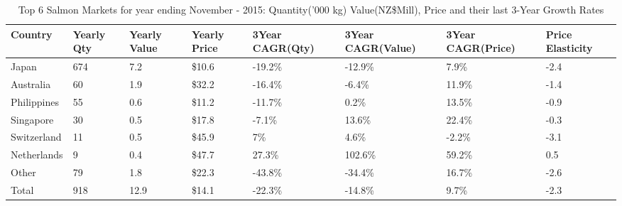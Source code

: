 \begin{table}[ht]
\centering
{\scriptsize
\begin{tabular}[t]{p{1.8cm}>{\hfill}p{1.4cm}>{\hfill}p{1.4cm}>{\hfill}p{1.6cm}>{\hfill}p{1.9cm}>{\hfill}p{2cm}>{\hfill}p{1.9cm}>{\hfill}p{1.5cm}}
 \textbf{Country} & \textbf{Yearly Qty} & \textbf{Yearly Value} & \textbf{Yearly Price} & \textbf{3Year CAGR(Qty)} & \textbf{3Year CAGR(Value)} & \textbf{3Year CAGR(Price)} & \textbf{Price Elasticity} \\
\hline
Japan & 674 & 7.2 & \$10.6 & -19.2\% & -12.9\% & 7.9\% & -2.4 \\  
Australia & 60 & 1.9 & \$32.2 & -16.4\% & -6.4\% & 11.9\% & -1.4 \\  
Philippines & 55 & 0.6 & \$11.2 & -11.7\% & 0.2\% & 13.5\% & -0.9 \\  
Singapore & 30 & 0.5 & \$17.8 & -7.1\% & 13.6\% & 22.4\% & -0.3 \\  
Switzerland & 11 & 0.5 & \$45.9 & 7\% & 4.6\% & -2.2\% & -3.1 \\  
Netherlands & 9 & 0.4 & \$47.7 & 27.3\% & 102.6\% & 59.2\% & 0.5 \\  
Other & 79 & 1.8 & \$22.3 & -43.8\% & -34.4\% & 16.7\% & -2.6 \\  
Total & 918 & 12.9 & \$14.1 & -22.3\% & -14.8\% & 9.7\% & -2.3 \\  
\hline
\end{tabular}
}
\caption{\scriptsize Top 6 Salmon Markets for year ending November - 2015: Quantity('000 kg) Value(NZ\$Mill), Price and their last 3-Year Growth Rates}
\end{table}


